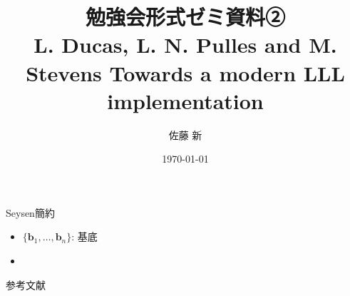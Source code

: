 \documentclass[12pt,aspectratio=169,table,dvipdfmx, leqno]{beamer}
\title[勉強会]{勉強会形式ゼミ資料②\\L. Ducas, L. N. Pulles and M. Stevens Towards a modern LLL implementation\cite{DPS25}}
\author[佐藤]{佐藤 新}
\date{\today}
\begin{document}
\maketitle

\begin{frame}{Seysen簡約}
\begin{itemize}
    \item $\{\bm{b}_1,\ldots, \bm{b}_n\}$: 基底
    \item 
\end{itemize}
\end{frame}

\begin{frame}[allowframebreaks]{参考文献}
\beamertemplatetextbibitems

\typeout{}

\end{frame}
\end{document}
